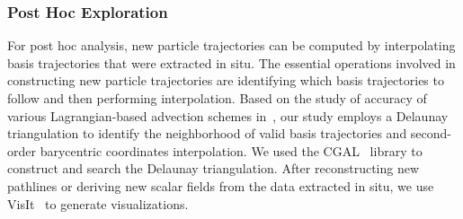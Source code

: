 \subsubsection{Post Hoc Exploration}
For post hoc analysis, new particle trajectories can be computed by interpolating basis trajectories that were extracted in situ.
%
The essential operations involved in constructing new particle trajectories are identifying which basis trajectories to follow and then performing interpolation.
%
Based on the study of accuracy of various Lagrangian-based advection schemes in~\cite{agranovsky2015subsampling}, our study employs a Delaunay triangulation to identify the neighborhood of valid basis trajectories and second-order barycentric coordinates interpolation.
%
We used the CGAL~\cite{fabri2011cgal} library to construct and search the Delaunay triangulation.
%
After reconstructing new pathlines or deriving new scalar fields from the data extracted in situ, we use VisIt~\cite{childs2012visit} to generate visualizations.
%
